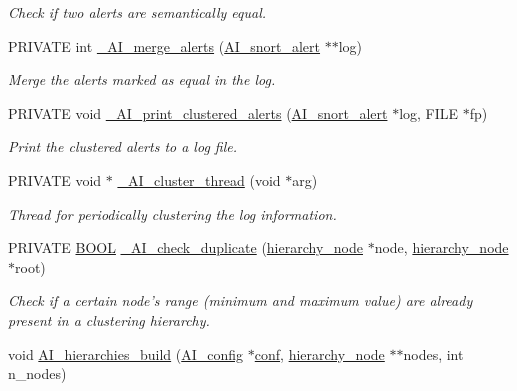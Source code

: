 \begin{DoxyCompactItemize}
\begin{DoxyCompactList}\small\item\em Check if two alerts are semantically equal. \item\end{DoxyCompactList}\item 
PRIVATE int \hyperlink{group__cluster_ga8ce8e5a5d8954672297fa2dedb380dcd}{\_\-AI\_\-merge\_\-alerts} (\hyperlink{struct__AI__snort__alert}{AI\_\-snort\_\-alert} $\ast$$\ast$log)
\begin{DoxyCompactList}\small\item\em Merge the alerts marked as equal in the log. \item\end{DoxyCompactList}\item 
PRIVATE void \hyperlink{group__cluster_ga7d151880080470b542e99643dc0426a7}{\_\-AI\_\-print\_\-clustered\_\-alerts} (\hyperlink{struct__AI__snort__alert}{AI\_\-snort\_\-alert} $\ast$log, FILE $\ast$fp)
\begin{DoxyCompactList}\small\item\em Print the clustered alerts to a log file. \item\end{DoxyCompactList}\item 
PRIVATE void $\ast$ \hyperlink{group__cluster_ga8a5eae61dc9fd0f13e0acdfa5f4478e2}{\_\-AI\_\-cluster\_\-thread} (void $\ast$arg)
\begin{DoxyCompactList}\small\item\em Thread for periodically clustering the log information. \item\end{DoxyCompactList}\item 
PRIVATE \hyperlink{spp__ai_8h_a3e5b8192e7d9ffaf3542f1210aec18dd}{BOOL} \hyperlink{group__cluster_ga29c35cd6c56f54e27b5b190c6d6c487a}{\_\-AI\_\-check\_\-duplicate} (\hyperlink{struct__hierarchy__node}{hierarchy\_\-node} $\ast$node, \hyperlink{struct__hierarchy__node}{hierarchy\_\-node} $\ast$root)
\begin{DoxyCompactList}\small\item\em Check if a certain node's range (minimum and maximum value) are already present in a clustering hierarchy. \item\end{DoxyCompactList}\item 
void \hyperlink{group__cluster_ga1445818b37483f78cc3fb2890155842c}{AI\_\-hierarchies\_\-build} (\hyperlink{structAI__config}{AI\_\-config} $\ast$\hyperlink{group__correlation_gaad7a982b6016390e7cd1164bd7db8bca}{conf}, \hyperlink{struct__hierarchy__node}{hierarchy\_\-node} $\ast$$\ast$nodes, int n\_\-nodes)

\end{DoxyCompactItemize}
